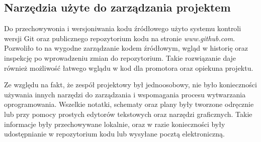 \subsection{Narzędzia użyte do zarządzania projektem}
Do przechowywonia i wersjoniwania kodu źródłowego użyto systemu kontroli wersji Git oraz publicznego repozytorium kodu na stronie \textit{www.github.com}. Pozwoliło to na wygodne zarządzanie kodem źródłowym, wgląd w historię oraz inspekcję po wprowadzeniu zmian do repozytorium. Takie rozwiązanie daje również możliwość łatwego wglądu w kod dla promotora oraz opiekuna projektu.

Ze względu na fakt, że zespół projektowy był jednoosobowy, nie było konieczności używania innych narzędzi do zarządzania i wspomagania procesu wytwarzania oprogramowania. Wszelkie notatki, schematy oraz plany były tworzone odręcznie lub przy pomocy prostych edytorów tekstowych oraz narzędzi graficznych. Takie informacje były przechowywane lokalnie, oraz w razie konieczności były udostępnianie w repozytorium kodu lub wysyłane pocztą elektroniczną.


\newpage